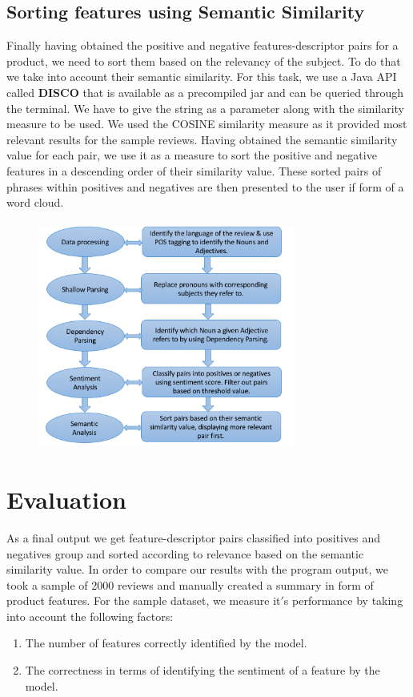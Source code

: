 \documentclass[conference]{IEEEtran}
\begin{document}
\subsection{\textbf{Sorting features using Semantic Similarity}}
\indent Finally having obtained the positive and negative features-descriptor pairs for a product, we need to sort them based on the relevancy of the subject. To do that we take into account their semantic similarity. For this task, we use a Java API called \textbf{DISCO} that is available as a precompiled jar and can be queried through the terminal. We have to give the string as a parameter along with the similarity measure to be used. We used the COSINE similarity measure as it provided most relevant results for the sample reviews. Having obtained the semantic similarity value for each pair, we use it as a measure to sort the positive and negative features in a descending order of their similarity value. These sorted pairs of phrases within positives and negatives are then presented to the user if form of a word cloud.
\begin{figure}[H]
\centering
\includegraphics[width=8.5cm, height=7.5cm]{flowchart.png}
\end{figure}

\section{\textbf{Evaluation}}
\indent As a final output we get feature-descriptor pairs classified into positives and negatives group and sorted according to relevance based on the semantic similarity value. In order to compare our results with the program output, we took a sample of 2000 reviews and manually created a summary in form of product features. For the sample dataset, we measure it$'$s performance by taking into account the following factors:
\begin{enumerate}
\item The number of features correctly identified by the model.
\item The correctness in terms of identifying the sentiment of a feature by the model.\end{enumerate}
\end{document}
